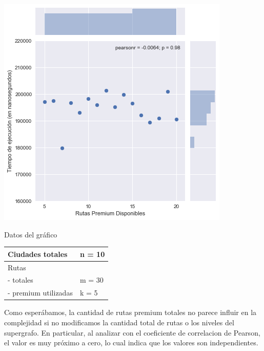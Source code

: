 \noindent
\begin{minipage}{0.55\textwidth}
	\hfill
	\includegraphics[scale=0.6]{imagenes/ej1-3-fib.png}
\end{minipage}
\hfill
\begin{minipage}{0.44\textwidth}
	\begin{center}
		Datos del gráfico

		\begin{tabular}{ | l l |}
			\hline
			Ciudades totales & n = 10 \\ \hline
			Rutas & \\
			- totales & m = 30 \\
			- premium utilizadas & k = 5 \\
			\hline
		\end{tabular}
	\end{center}
\end{minipage}

Como esperábamos, la cantidad de rutas premium totales no parece influir en la complejidad si no modificamos la cantidad total de rutas o los niveles del supergrafo. En particular, al analizar con el coeficiente de correlacion de Pearson, el valor es muy próximo a cero, lo cual indica que los valores son independientes.

